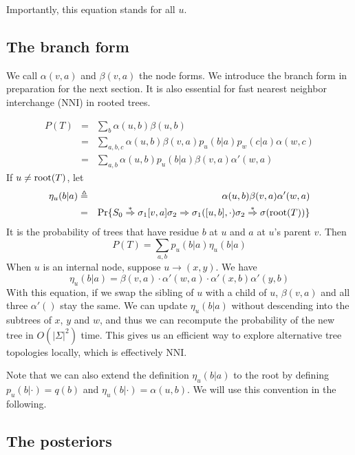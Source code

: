 \documentclass[10pt]{article}
\begin{document}
Importantly, this equation stands for all $u$.

\subsection{The branch form}

We call $\alpha(v,a)$ and $\beta(v,a)$ the node forms.
We introduce the branch form in preparation for the next section.
It is also essential for fast nearest neighbor interchange (NNI) in rooted trees.

\begin{eqnarray*}
P(T)
&=&\sum_b\alpha(u,b)\beta(u,b)\\
&=&\sum_{a,b,c}\alpha(u,b)\beta(v,a)p_u(b|a)p_w(c|a)\alpha(w,c)\\
&=&\sum_{a,b}\alpha(u,b)p_u(b|a)\beta(v,a)\alpha'(w,a)
\end{eqnarray*}
If $u\not={\rm root}(T)$, let
\begin{eqnarray*}
\eta_u(b|a)&\triangleq&\alpha(u,b)\beta(v,a)\alpha'(w,a) \\
&=&\Pr\{S_0\stackrel{*}{\Rightarrow}\sigma_1[v,a]\sigma_2\Rightarrow\sigma_1([u,b],\cdot)\sigma_2\stackrel{*}{\Rightarrow}\sigma({\rm root}(T))\}
\end{eqnarray*}
It is the probability of trees that have residue $b$ at $u$ and $a$ at $u$'s parent $v$.
Then
$$ P(T)=\sum_{a,b}p_u(b|a)\eta_u(b|a) $$
When $u$ is an internal node, suppose $u\to(x,y)$. We have
$$
\eta_u(b|a)=\beta(v,a)\cdot\alpha'(w,a)\cdot\alpha'(x,b)\alpha'(y,b)
$$
With this equation, if we swap the sibling of $u$ with a child of $u$,
$\beta(v,a)$ and all three $\alpha'()$ stay the same.
We can update $\eta_u(b|a)$ without descending into the subtrees of $x$, $y$ and $w$,
and thus we can recompute the probability of the new tree in $O(|\Sigma|^2)$ time.
This gives us an efficient way to explore alternative tree topologies locally,
which is effectively NNI.

Note that we can also extend the definition $\eta_u(b|a)$ to the root by defining
$p_u(b|\cdot)=q(b)$ and $\eta_u(b|\cdot)=\alpha(u,b)$.
We will use this convention in the following.

\subsection{The posteriors}
\end{document}
